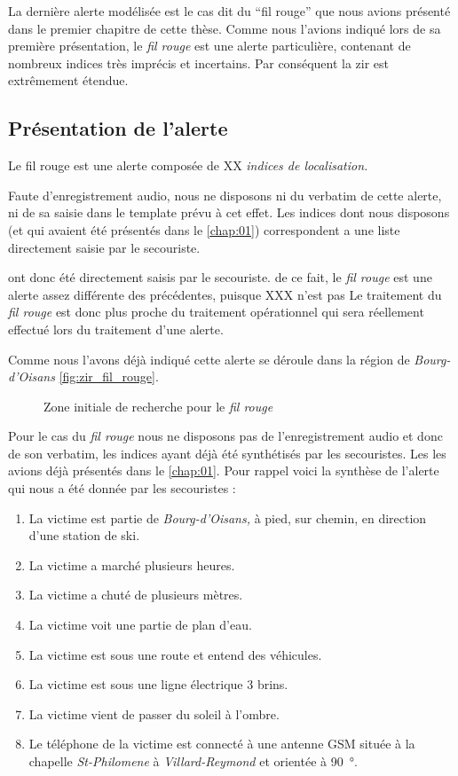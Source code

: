 La dernière alerte modélisée est le cas dit du \enquote{fil rouge} que
nous avions présenté dans le premier chapitre de cette thèse. Comme
nous l'avions indiqué lors de sa première présentation, le \emph{fil
  rouge} est une alerte particulière, contenant de nombreux indices
très imprécis et incertains. Par conséquent la \ac{zir} est
extrêmement étendue.


\subsection{Présentation de l'alerte}
\label{subsec:9-4-1}

Le fil rouge est une alerte composée de XX \emph{indices de
  localisation.}




Faute d'enregistrement audio, nous ne disposons ni du verbatim de
cette alerte, ni de sa saisie dans le template prévu à cet effet. Les
indices dont nous disposons (et qui avaient été présentés dans le
\autoref{chap:01}) correspondent a une liste directement saisie par le
secouriste.

ont donc été directement saisis par le secouriste.
%
de ce fait, le \emph{fil rouge} est une alerte assez différente des
précédentes, puisque XXX n'est pas
%
Le traitement du \emph{fil rouge} est donc plus proche du traitement
opérationnel qui sera réellement effectué lors du traitement d'une
alerte.

Comme nous l'avons déjà indiqué cette alerte se déroule dans la région
de \emph{Bourg-d'Oisans} \autoref{fig:zir_fil_rouge}.

\begin{figure}
  \centering
  
  \caption{Zone initiale de recherche pour le \emph{fil rouge}}
  \label{fig:zir_fil_rouge}
\end{figure}

Pour le cas du \emph{fil rouge} nous ne disposons pas de
l'enregistrement audio et donc de son verbatim, les indices ayant déjà 
été synthétisés par les secouristes. Les les avions déjà présentés
dans le \autoref{chap:01}.
%
Pour rappel voici la synthèse de l'alerte qui nous a été donnée par
les secouristes :
%
\begin{enumerate}
\item La victime est partie de \emph{Bourg-d'Oisans,} à pied, sur
  chemin, en direction d'une station de ski.
\item La victime a marché plusieurs heures.
\item La victime a chuté de plusieurs mètres.
\item La victime voit une partie de plan d'eau.
\item La victime est sous une route et entend des véhicules.
\item La victime est sous une ligne électrique 3 brins.
\item La victime vient de passer du soleil à l'ombre.
\item Le téléphone de la victime est connecté à une antenne GSM située
  à la chapelle \emph{St-Philomene} à \emph{Villard-Reymond} et
  orientée à \SI{90}{\degree}.
\end{enumerate}

